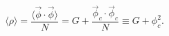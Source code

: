 \begin{equation}
\langle \rho \rangle =  \frac {\langle \vec \phi \cdot  \vec \phi
\rangle}{N}
= G + \frac {\vec \phi_c \cdot \vec \phi_c}{N} \equiv G+\phi_c^2  .
\end{equation}

